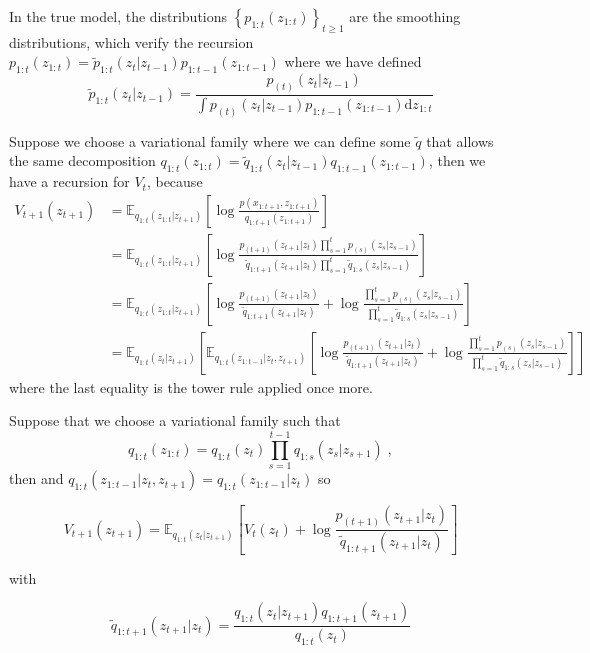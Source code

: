 \documentclass{article}
\newcommand{\1}{\mathbbm{1}}
\newcommand{\rmd}{\ensuremath{\mathrm{d}}}
\newcommand{\eqsp}{\;}
\newcommand{\expect}[2]{\mathbb{E}_{#1}\left[#2\right]}
\newcommand{\vbackward}[1]{q_{1:#1}(z_{#1}|z_{#1 + 1})}
\newcommand{\vfilt}[1]{q_{1:#1}(z_{#1})}
\begin{document}
In the true model, the distributions $\left\{p_{1:t}(z_{1:t})\right\}_{t \geq 1}$ are the smoothing distributions, which verify the recursion $p_{1:t}(z_{1:t}) = \tilde{p}_{1:t}(z_t|z_{t-1}) p_{1:t-1}(z_{1:t-1})$ where we have defined $$\tilde{p}_{1:t}(z_t|z_{t-1}) = \frac{p_{(t)}(z_{t}|z_{t-1})}{\int p_{(t)}(z_{t}|z_{t-1})p_{1:t-1}(z_{1:t-1})\rmd z_{1:t}}$$

Suppose we choose a variational family where we can define some $\tilde{q}$ that allows the same decomposition $q_{1:t}(z_{1:t}) = \tilde{q}_{1:t}(z_t|z_{t-1}) q_{1:t-1}(z_{1:t-1})$, then we have a recursion for $V_t$, because
\begin{align*}
V_{t+1}(z_{t+1}) &= \expect{q_{1:t}(z_{1:t}|z_{t+1})}{\log \frac{p(x_{1:t+1},z_{1:t+1})}{q_{1:t+1}(z_{1:t+1})}} \\
                   &= \expect{q_{1:t}(z_{1:t}|z_{t+1})}{\log\frac{p_{(t+1)}(z_{t+1}|z_t)\prod_{s=1}^t p_{(s)}(z_s|z_{s-1})}{\tilde{q}_{1:t+1}(z_{t+1}|z_t)\prod_{s=1}^t \tilde{q}_{1:s}(z_s|z_{s-1})}}\\
                   &= \expect{q_{1:t}(z_{1:t}|z_{t+1})}{\log\frac{p_{(t+1)}(z_{t+1}|z_t)}{\tilde{q}_{1:t+1}(z_{t+1}|z_t)} + \log\frac{\prod_{s=1}^t p_{(s)}(z_s|z_{s-1})}{\prod_{s=1}^t \tilde{q}_{1:s}(z_s|z_{s-1})}} \\
                   &= \expect{q_{1:t}( z_t|z_{t+1})}{\expect{q_{1:t}(z_{1:t-1}|z_t,z_{t+1})}{
                           \log\frac{p_{(t+1)}(z_{t+1}|z_t)}{\tilde{q}_{1:t+1}(z_{t+1}|z_t)} + \log\frac{\prod_{s=1}^t p_{(s)}(z_s|z_{s-1})}{\prod_{s=1}^t \tilde{q}_{1:s}(z_s|z_{s-1})}}}
\end{align*}
where the last equality is the tower rule applied once more. 

Suppose that we choose a variational family such that 
\begin{equation}\label{backward_fact}
    q_{1:t}(z_{1:t}) = \vfilt{t}\prod_{s=1}^{t-1} q_{1:s}(z_s|z_{s+1})\eqsp,
\end{equation}
then and $q_{1:t}(z_{1:t-1}|z_t, z_{t+1}) = q_{1:t}(z_{1:t-1}|z_t)$ so

\begin{equation}\label{v_t_recursion}
    V_{t+1}(z_{t+1}) = \expect{\vbackward{t}}{V_t(z_t) + \log\frac{p_{(t+1)}(z_{t+1}|z_t)}{\tilde{q}_{1:t+1}(z_{t+1}|z_t)}}
\end{equation}

with 

\begin{equation}
    \tilde{q}_{1:t+1}(z_{t+1}|z_t) = \frac{\vbackward{t}\vfilt{t+1}}{\vfilt{t}}
\end{equation}
\end{document}
